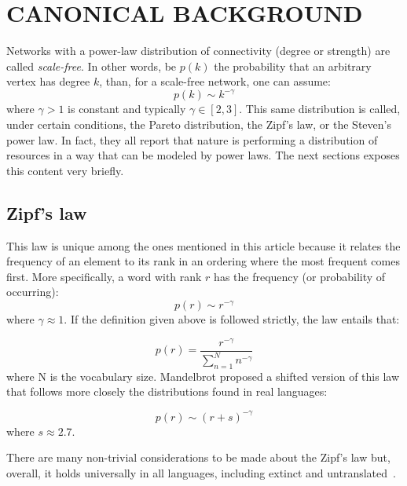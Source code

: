 \documentclass[12pt,fleqn]{article}
\begin{document}
\section{CANONICAL BACKGROUND}\label{sec:can}
Networks with a power-law distribution of connectivity (degree or strength)
are called \emph{scale-free}.
In other words, be $p(k)$ the probability that an arbitrary vertex has degree $k$,
than, for a scale-free network, one can assume:
\begin{equation}
p(k) \sim k^{-\gamma}
\end{equation}
\noindent where $\gamma > 1$ is constant and typically $\gamma \in [2,3]$.
This same distribution is called, under certain conditions, the Pareto distribution, the Zipf's law,
or the Steven's power law.
In fact, they all report that nature is performing a distribution of resources in
a way that can be modeled by power laws.
The next sections exposes this content very briefly.


\subsection{Zipf's law}
This law is unique among the ones mentioned in this article because it
relates the frequency of an element to its rank in an ordering where the
most frequent comes first.
More specifically, a word with rank $r$ has the frequency (or probability of occurring):
\begin{equation}\label{eq:pl}
p(r) \sim r^{-\gamma}
\end{equation}
\noindent where $\gamma \approx 1$.
If the definition given above is followed strictly, the law entails
that:

\begin{equation}
	p(r) = \frac{r^{-\gamma}}{\sum_{n=1}^N n^{-\gamma}}
\end{equation}
\noindent where N is the vocabulary size.
Mandelbrot proposed a shifted version of this law that
follows more closely the distributions found in real languages:

\begin{equation}
	p(r) \sim (r+s)^{-\gamma}
\end{equation}
\noindent where $s\approx 2.7$.

There are many non-trivial considerations to be made
about the Zipf's law but, overall, it holds universally
in all languages, including extinct and untranslated~\citep{zipf}.
\end{document}
